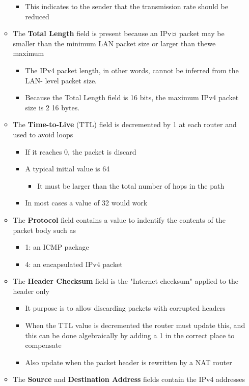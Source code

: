 \documentclass[11pt]{article}
\providecommand{\tightlist}{%
      \setlength{\itemsep}{0pt}\setlength{\parskip}{0pt}}
\begin{document}
\begin{itemize}
\begin{itemize}
    \begin{itemize}
    \tightlist
    \item
      This indicates to the sender that the transmission rate should be
      reduced
    \end{itemize}
  \item
    The \textbf{Total Length} field is present because an IPv¤ packet
    may be smaller than the minimum LAN packet size or larger than thewe
    maximum

    \begin{itemize}
    \tightlist
    \item
      The IPv4 packet length, in other words, cannot be inferred from
      the LAN- level packet size.
    \item
      Because the Total Length field is 16 bits, the maximum IPv4 packet
      size is 2 16 bytes.
    \end{itemize}
  \item
    The \textbf{Time-to-Live} (TTL) field is decremented by 1 at each
    router and used to avoid loops

    \begin{itemize}
    \tightlist
    \item
      If it reaches 0, the packet is discard
    \item
      A typical initial value is 64

      \begin{itemize}
      \tightlist
      \item
        It must be larger than the total number of hops in the path
      \end{itemize}
    \item
      In most cases a value of 32 would work
    \end{itemize}
  \item
    The \textbf{Protocol} field contains a value to indentify the
    contents of the packet body such as

    \begin{itemize}
    \tightlist
    \item
      1: an ICMP package
    \item
      4: an encapsulated IPv4 packet
    \end{itemize}
  \item
    The \textbf{Header Checksum} field is the "Internet checksum"
    applied to the header only

    \begin{itemize}
    \tightlist
    \item
      It purpose is to allow discarding packets with corrupted headers
    \item
      When the TTL value is decremented the router must update this, and
      this can be done algebraically by adding a 1 in the correct place
      to compensate
    \item
      Also update when the packet header is rewritten by a NAT router
    \end{itemize}
  \item
    The \textbf{Source} and \textbf{Destination Address} fields contain
    the IPv4 addresses


\end{itemize}
\end{itemize}
\end{document}
